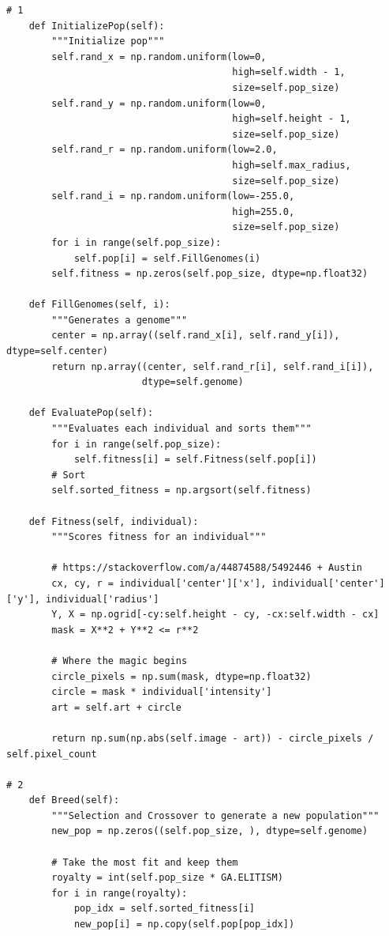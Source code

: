 \documentclass[12pt]{article}
\begin{document}
\begin{verbatim}
# 1
    def InitializePop(self):
        """Initialize pop"""
        self.rand_x = np.random.uniform(low=0,
                                        high=self.width - 1,
                                        size=self.pop_size)
        self.rand_y = np.random.uniform(low=0,
                                        high=self.height - 1,
                                        size=self.pop_size)
        self.rand_r = np.random.uniform(low=2.0,
                                        high=self.max_radius,
                                        size=self.pop_size)
        self.rand_i = np.random.uniform(low=-255.0,
                                        high=255.0,
                                        size=self.pop_size)
        for i in range(self.pop_size):
            self.pop[i] = self.FillGenomes(i)
        self.fitness = np.zeros(self.pop_size, dtype=np.float32)

    def FillGenomes(self, i):
        """Generates a genome"""
        center = np.array((self.rand_x[i], self.rand_y[i]), dtype=self.center)
        return np.array((center, self.rand_r[i], self.rand_i[i]),
                        dtype=self.genome)

    def EvaluatePop(self):
        """Evaluates each individual and sorts them"""
        for i in range(self.pop_size):
            self.fitness[i] = self.Fitness(self.pop[i])
        # Sort
        self.sorted_fitness = np.argsort(self.fitness)

    def Fitness(self, individual):
        """Scores fitness for an individual"""

        # https://stackoverflow.com/a/44874588/5492446 + Austin
        cx, cy, r = individual['center']['x'], individual['center']['y'], individual['radius']
        Y, X = np.ogrid[-cy:self.height - cy, -cx:self.width - cx]
        mask = X**2 + Y**2 <= r**2

        # Where the magic begins
        circle_pixels = np.sum(mask, dtype=np.float32)
        circle = mask * individual['intensity']
        art = self.art + circle

        return np.sum(np.abs(self.image - art)) - circle_pixels / self.pixel_count

# 2
    def Breed(self):
        """Selection and Crossover to generate a new population"""
        new_pop = np.zeros((self.pop_size, ), dtype=self.genome)

        # Take the most fit and keep them
        royalty = int(self.pop_size * GA.ELITISM)
        for i in range(royalty):
            pop_idx = self.sorted_fitness[i]
            new_pop[i] = np.copy(self.pop[pop_idx])


\end{verbatim}
\end{document}
